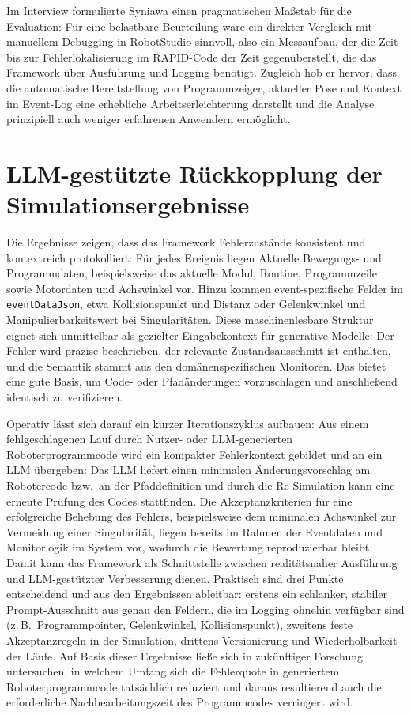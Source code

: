 {  Im Interview formulierte Syniawa einen pragmatischen Maßstab für
  die Evaluation:
  Für eine belastbare Beurteilung wäre ein direkter Vergleich mit manuellem
  Debugging in RobotStudio sinnvoll, also ein Messaufbau, der die Zeit bis zur
  Fehlerlokalisierung im RAPID-Code der Zeit gegenüberstellt, die das Framework
  über Ausführung und Logging benötigt. Zugleich hob er hervor, dass die
  automatische Bereitstellung von Programmzeiger, aktueller Pose und Kontext im
  Event-Log eine erhebliche Arbeitserleichterung darstellt und die Analyse
  prinzipiell auch weniger erfahrenen Anwendern ermöglicht.

  \section{LLM-gestützte Rückkopplung der Simulationsergebnisse}

  Die Ergebnisse zeigen, dass das Framework Fehlerzustände konsistent
  und kontextreich protokolliert: Für jedes Ereignis liegen
  Aktuelle Bewegungs- und Programmdaten, beispielsweise das aktuelle
  Modul, Routine,
  Programmzeile sowie Motordaten und Achswinkel vor. Hinzu kommen
  event-spezifische Felder im \texttt{eventDataJson}, etwa
  Kollisionspunkt und Distanz oder Gelenkwinkel und
  Manipulierbarkeitswert bei Singularitäten. Diese maschinenlesbare
  Struktur eignet sich unmittelbar als gezielter Eingabekontext für
  generative Modelle: Der Fehler wird präzise beschrieben, der
  relevante Zustandsausschnitt ist enthalten, und die Semantik stammt
  aus den domänenspezifischen Monitoren. Das bietet eine gute Basis, um Code-
  oder Pfadänderungen vorzuschlagen und anschließend identisch zu
  verifizieren.

  Operativ lässt sich darauf ein kurzer Iterationszyklus aufbauen: Aus
  einem fehlgeschlagenen Lauf durch Nutzer- oder LLM-generierten
  Roboterprogrammcode wird ein kompakter Fehlerkontext
  gebildet und an ein LLM übergeben: Das
  LLM liefert einen minimalen Änderungsvorschlag am Robotercode
  bzw.\ an der Pfaddefinition und durch die Re-Simulation kann eine erneute
  Prüfung des Codes stattfinden. Die Akzeptanzkriterien für eine erfolgreiche
  Behebung des Fehlers, beispielsweise dem minimalen Achswinkel zur Vermeidung
  einer Singularität, liegen bereits
  im Rahmen der Eventdaten und Monitorlogik im System vor, wodurch die
  Bewertung reproduzierbar bleibt.
  Damit kann das Framework als
  Schnittstelle zwischen realitätsnaher Ausführung und
  LLM-gestützter Verbesserung dienen. Praktisch sind drei Punkte entscheidend
  und aus den Ergebnissen ableitbar: erstens ein schlanker, stabiler
  Prompt-Ausschnitt aus genau den Feldern, die im Logging ohnehin
  verfügbar sind (z.\,B.\ Programmpointer, Gelenkwinkel,
  Kollisionspunkt), zweitens feste Akzeptanzregeln in der Simulation,
  drittens Versionierung und Wiederholbarkeit der Läufe. Auf Basis dieser
  Ergebnisse ließe sich in zukünftiger Forschung untersuchen, in welchem Umfang
  sich die Fehlerquote in generiertem Roboterprogrammcode tatsächlich reduziert
  und daraus resultierend auch die erforderliche Nachbearbeitungszeit
  des Programmcodes verringert wird.

}
